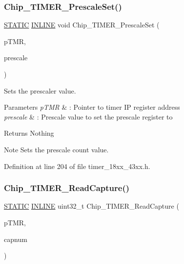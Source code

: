 \subsubsection{\texorpdfstring{Chip\+\_\+\+T\+I\+M\+E\+R\+\_\+\+Prescale\+Set()}{Chip\_TIMER\_PrescaleSet()}}
{\footnotesize\ttfamily \hyperlink{group___l_p_c___types___public___macros_ga10b2d890d871e1489bb02b7e70d9bdfb}{S\+T\+A\+T\+IC} \hyperlink{spifi__18xx__43xx_8h_a2eb6f9e0395b47b8d5e3eeae4fe0c116}{I\+N\+L\+I\+NE} void Chip\+\_\+\+T\+I\+M\+E\+R\+\_\+\+Prescale\+Set (\begin{DoxyParamCaption}\item[{\hyperlink{struct_l_p_c___t_i_m_e_r___t}{L\+P\+C\+\_\+\+T\+I\+M\+E\+R\+\_\+T} $\ast$}]{p\+T\+MR,  }\item[{uint32\+\_\+t}]{prescale }\end{DoxyParamCaption})}



Sets the prescaler value. 


\begin{DoxyParams}{Parameters}
{\em p\+T\+MR} & \+: Pointer to timer IP register address \\
\hline
{\em prescale} & \+: Prescale value to set the prescale register to \\
\hline
\end{DoxyParams}
\begin{DoxyReturn}{Returns}
Nothing 
\end{DoxyReturn}
\begin{DoxyNote}{Note}
Sets the prescale count value. 
\end{DoxyNote}


Definition at line 204 of file timer\+\_\+18xx\+\_\+43xx.\+h.

\mbox{\label{group___t_i_m_e_r__18_x_x__43_x_x_ga7eab047dd60eef7fb0f042266f9dae05}} 
\subsubsection{\texorpdfstring{Chip\+\_\+\+T\+I\+M\+E\+R\+\_\+\+Read\+Capture()}{Chip\_TIMER\_ReadCapture()}}
{\footnotesize\ttfamily \hyperlink{group___l_p_c___types___public___macros_ga10b2d890d871e1489bb02b7e70d9bdfb}{S\+T\+A\+T\+IC} \hyperlink{spifi__18xx__43xx_8h_a2eb6f9e0395b47b8d5e3eeae4fe0c116}{I\+N\+L\+I\+NE} uint32\+\_\+t Chip\+\_\+\+T\+I\+M\+E\+R\+\_\+\+Read\+Capture (\begin{DoxyParamCaption}\item[{\hyperlink{struct_l_p_c___t_i_m_e_r___t}{L\+P\+C\+\_\+\+T\+I\+M\+E\+R\+\_\+T} $\ast$}]{p\+T\+MR,  }\item[{int8\+\_\+t}]{capnum }\end{DoxyParamCaption})}



